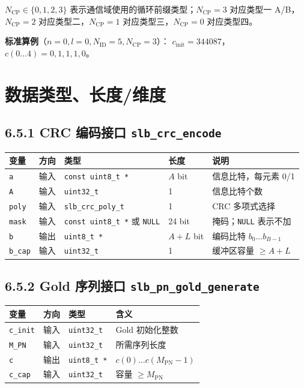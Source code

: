 \documentclass[11pt,a4paper]{ctexart}
\begin{document}
$N_{\mathrm{CP}} \in \{0, 1, 2, 3\}$ 表示通信域使用的循环前缀类型；$N_{\mathrm{CP}}{=}3$ 对应类型一 A/B，$N_{\mathrm{CP}}{=}2$ 对应类型二，$N_{\mathrm{CP}}{=}1$ 对应类型三，$N_{\mathrm{CP}}{=}0$ 对应类型四。

\textbf{标准算例}（$n{=}0,l{=}0,N_{\mathrm{ID}}{=}5,N_{\mathrm{CP}}{=}3$）：
$c_{\mathrm{init}}=344087$，$c(0\ldots 4)=0,1,1,1,0$。

\section{数据类型、长度/维度}

\subsection{6.5.1 CRC 编码接口 \texttt{slb\_crc\_encode}}

\begin{table}[h]
\centering
\small
\begin{tabular}{lllll}
\toprule
\textbf{变量} & \textbf{方向} & \textbf{类型} & \textbf{长度} & \textbf{说明} \\
\midrule
\texttt{a} & 输入 & \texttt{const uint8\_t *} & $A$ bit & 信息比特，每元素 0/1 \\
\texttt{A} & 输入 & \texttt{uint32\_t} & 1 & 信息比特个数 \\
\texttt{poly} & 输入 & \texttt{slb\_crc\_poly\_t} & 1 & CRC 多项式选择 \\
\texttt{mask} & 输入 & \texttt{const uint8\_t *} 或 \texttt{NULL} & 24 bit & 掩码；\texttt{NULL} 表示不加 \\
\texttt{b} & 输出 & \texttt{uint8\_t *} & $A{+}L$ bit & 编码比特 $b_0\ldots b_{B-1}$ \\
\texttt{b\_cap} & 输入 & \texttt{uint32\_t} & 1 & 缓冲区容量 $\geq A{+}L$ \\
\bottomrule
\end{tabular}
\end{table}

\subsection{6.5.2 Gold 序列接口 \texttt{slb\_pn\_gold\_generate}}

\begin{table}[h]
\centering
\small
\begin{tabular}{llll}
\toprule
\textbf{变量} & \textbf{方向} & \textbf{类型} & \textbf{含义} \\
\midrule
\texttt{c\_init} & 输入 & \texttt{uint32\_t} & Gold 初始化整数 \\
\texttt{M\_PN} & 输入 & \texttt{uint32\_t} & 所需序列长度 \\
\texttt{c} & 输出 & \texttt{uint8\_t *} & $c(0)\ldots c(M_{\mathrm{PN}}{-}1)$ \\
\texttt{c\_cap} & 输入 & \texttt{uint32\_t} & 容量 $\geq M_{\mathrm{PN}}$ \\
\bottomrule
\end{tabular}
\end{table}
\end{document}
